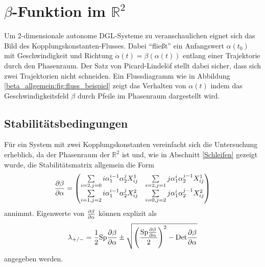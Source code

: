 \clearpage
\section{$\beta$-Funktion im $\mathbb{R}^2$}\label{beta_im_R2}
   Um 2-dimensionale autonome DGL-Systeme zu veranschaulichen eignet sich das 
   Bild des Kopplungskonstanten-Flusses. Dabei "`fließt"' ein Anfangswert 
   $\alpha(t_0)$ mit Geschwindigkeit und Richtung $\dot\alpha(t) = 
   \beta(\alpha(t))$ entlang einer Trajektorie durch 
   den Phasenraum. Der Satz von Picard-Lindelöf stellt dabei sicher, dass 
   sich zwei Trajektorien nicht schneiden. Ein Flussdiagramm wie in Abbildung 
   \ref{beta_allgemein:fig:fluss_beispiel} zeigt das Verhalten von $\alpha(t)$ 
   indem das Geschwindigkeitsfeld $\beta$ durch Pfeile im Phasenraum 
   dargestellt wird.
    

  \subsection{Stabilitätsbedingungen}
    Für ein System mit zwei Kopplungskonstanten vereinfacht sich die 
    Untersuchung erheblich, da der Phasenraum der $\mathbb{R}^2$ ist und, wie in 
    Abschnitt \ref{Schleifen} gezeigt wurde, die Stabilitätsmatrix allgemein 
    die Form
	\begin{equation}
	 \frac{\partial \beta}{\partial \alpha} = \begin{pmatrix}
	          \sum\limits_{i=2,j=0}i \alpha_1^{i-1} \alpha_2^j X^1_{ij} &
	          \sum\limits_{i=2,j=1}j \alpha_1^i \alpha_2^{j-1} X^1_{ij}\\
	          \sum\limits_{i=1,j=2}i \alpha_1^{i-1} \alpha_2^j X^2_{ij} &
	          \sum\limits_{i=0,j=2}j \alpha_1^i \alpha_2^{j-1} X^2_{ij}
	         \end{pmatrix}\label{eq:beta_im_R2:stab_matrix}
	\end{equation}
    annimmt. Eigenwerte von $\frac{\partial \beta}{\partial \alpha}$ können explizit 
    als\begin{equation}
    \lambda_{+/-}=\frac12 \text{Sp} \frac{\partial \beta}{\partial \alpha} \pm \sqrt{ \left( \frac{\text{Sp} \frac{\partial \beta}{\partial \alpha}}{2} \right)^2-\text{Det} \frac{\partial \beta}{\partial \alpha} } \label{eq:beta_im_R2:lambda}
    \end{equation}
    angegeben werden. 
